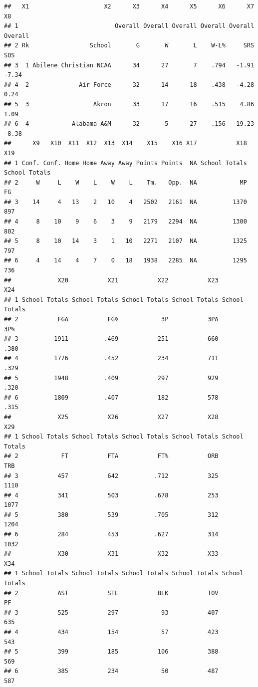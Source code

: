 \documentclass[]{book}
\begin{document}
\begin{verbatim}
##   X1                     X2      X3      X4      X5      X6      X7      X8
## 1                           Overall Overall Overall Overall Overall Overall
## 2 Rk                 School       G       W       L    W-L%     SRS     SOS
## 3  1 Abilene Christian NCAA      34      27       7    .794   -1.91   -7.34
## 4  2              Air Force      32      14      18    .438   -4.28    0.24
## 5  3                  Akron      33      17      16    .515    4.86    1.09
## 6  4            Alabama A&M      32       5      27    .156  -19.23   -8.38
##      X9   X10  X11  X12  X13  X14    X15    X16 X17           X18           X19
## 1 Conf. Conf. Home Home Away Away Points Points  NA School Totals School Totals
## 2     W     L    W    L    W    L    Tm.   Opp.  NA            MP            FG
## 3    14     4   13    2   10    4   2502   2161  NA          1370           897
## 4     8    10    9    6    3    9   2179   2294  NA          1300           802
## 5     8    10   14    3    1   10   2271   2107  NA          1325           797
## 6     4    14    4    7    0   18   1938   2285  NA          1295           736
##             X20           X21           X22           X23           X24
## 1 School Totals School Totals School Totals School Totals School Totals
## 2           FGA           FG%            3P           3PA           3P%
## 3          1911          .469           251           660          .380
## 4          1776          .452           234           711          .329
## 5          1948          .409           297           929          .320
## 6          1809          .407           182           578          .315
##             X25           X26           X27           X28           X29
## 1 School Totals School Totals School Totals School Totals School Totals
## 2            FT           FTA           FT%           ORB           TRB
## 3           457           642          .712           325          1110
## 4           341           503          .678           253          1077
## 5           380           539          .705           312          1204
## 6           284           453          .627           314          1032
##             X30           X31           X32           X33           X34
## 1 School Totals School Totals School Totals School Totals School Totals
## 2           AST           STL           BLK           TOV            PF
## 3           525           297            93           407           635
## 4           434           154            57           423           543
## 5           399           185           106           388           569
## 6           385           234            50           487           587
\end{verbatim}
\end{document}
